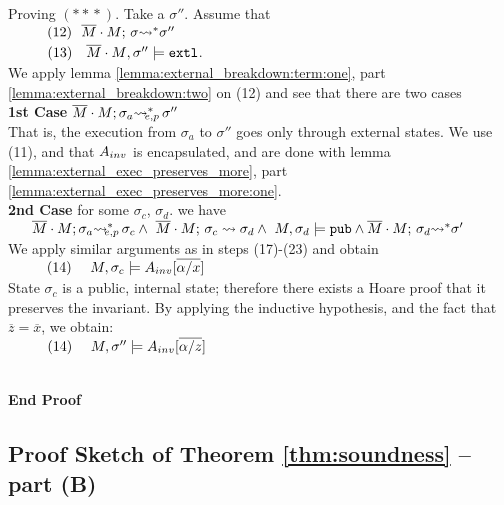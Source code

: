 \begin{description}
Proving   $(*\!*\!*)$. Take a $\sigma''$. Assume that\\
$\SPS (12) \ \ \leadstoBoundedStar   {\Mtwo\cdot M}  {\sigma}  {\sigma''}$\\
$\strut \ \ \hspace{0.5cm} \ \  (13) \ \ \ {\overline{M}\cdot M}, \sigma'' \models \mbox{\normalfont{\texttt{extl}}}$.\\
We apply lemma \ref{lemma:external_breakdown:term:one}, part \ref{lemma:external_breakdown:two}
on (12) and see that there are two cases\\
\textbf{1st Case} $\overline{M}\cdot M; \sigma_a {\rightsquigarrow^*}\!\!\!\!_{e,p}\, \sigma''$\\
That is, the execution from $\sigma_a$ to $\sigma''$ goes only through external states. 
We use (11), and that 
 $A_{inv}$ is encapsulated, and are done with lemma \ref{lemma:external_exec_preserves_more}, part 
 \ref{lemma:external_exec_preserves_more:one}.
\\
\textbf{2nd Case} for some  $\sigma_c$, $\sigma_d.$ we have\\
$
\strut \ \ \ \ \ \overline{M}\cdot M; \sigma_a {\rightsquigarrow^*}\!\!\!\!_{e,p}\, \sigma_c 
\wedge\ \overline{M}\cdot M;\, {\sigma_c} \rightsquigarrow \sigma_d 
\wedge \ M, \sigma_d \models \mbox{\normalfont{\texttt{pub}}} \wedge \overline{M}\cdot M;\, {\sigma_d} {\rightsquigarrow^*} \sigma'$\\
We apply similar arguments as in steps (17)-(23) and obtain \\
$\strut \ \ \hspace{0.5cm} \ \  (14) \ \ \ \ {M, \sigma_c \models A_{inv}[\overline{\alpha/x} ]} $ 
\\
State $\sigma_c$ is a public, internal state;  therefore there exists a Hoare proof that it preserves the invariant.
By applying the inductive hypothesis, and the fact that $\overline z = \overline x$, we obtain:
\\
$\strut \ \ \hspace{0.5cm} \ \  (14) \ \ \ \ {M, \sigma'' \models A_{inv}[\overline{\alpha/z} ]} $
\\
~ \\

\end{description}
\noindent
\vspace{.1cm}
  {\textbf{End Proof}} 

\subsection{Proof Sketch of Theorem  \ref{thm:soundness} -- part (B)}

